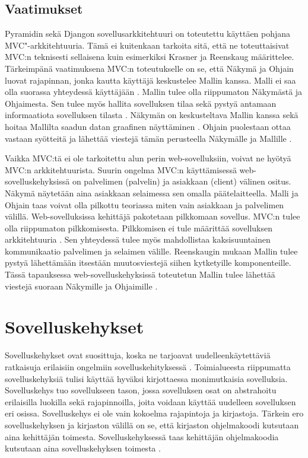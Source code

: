 \documentclass[utf8]{gradu3}
\begin{document}
\section{Vaatimukset}
Pyramidin sekä Djangon sovellusarkkitehtuuri on toteutettu käyttäen pohjana MVC"-arkkitehtuuria. Tämä ei kuitenkaan tarkoita sitä, että ne toteuttaisivat MVC:n teknisesti sellaisena kuin esimerkiksi Krasner \parencite{krasner_desc} ja Reenskaug \parencite{reenskaug_tools} määrittelee. Tärkeimpänä vaatimuksena MVC:n toteutukselle on se, että Näkymä ja Ohjain luovat rajapinnan, jonka kautta käyttäjä keskustelee Mallin kanssa. Malli ei saa olla suorassa yhteydessä käyttäjään \parencite[s. 10]{reenskaug_tools}. Mallin tulee olla riippumaton Näkymästä ja Ohjaimesta. Sen tulee myös hallita sovelluksen tilaa sekä pystyä antamaan informaatiota sovelluksen tilasta \parencite{burbeck}. Näkymän on keskusteltava Mallin kanssa sekä hoitaa Mallilta saadun datan graafinen näyttäminen \parencite[s.1]{reenskaug_orig}. Ohjain puolestaan ottaa vastaan syötteitä ja lähettää viestejä tämän perusteella Näkymälle ja Mallille \parencite{burbeck}.

Vaikka MVC:tä ei ole tarkoitettu alun perin web-sovelluksiin, voivat ne hyötyä MVC:n arkkitehtuurista. Suurin ongelma MVC:n käyttämisessä web-sovelluskehyksissä on palvelimen (palvelin) ja asiakkaan (client) välinen ositus. Näkymä näytetään aina asiakkaan selaimessa sen omalla päätelaitteella. Malli ja Ohjain taas voivat olla pilkottu teoriassa miten vain asiakkaan ja palvelimen välillä. Web-sovelluksissa kehittäjä pakotetaan pilkkomaan sovellus. MVC:n tulee olla riippumaton pilkkomisesta. Pilkkomisen ei tule määrittää sovelluksen arkkitehtuuria \parencite{ibm_watson}. Sen yhteydessä tulee myös mahdollistaa kaksisuuntainen kommunikaatio palvelimen ja selaimen välille. Reenskaugin mukaan Mallin tulee pystyä lähettämään itsestään muutosviestejä siihen kytketyille komponenteille. Tässä tapauksessa web-sovelluskehyksissä toteutetun Mallin tulee lähettää viestejä suoraan Näkymille ja Ohjaimille \parencite{reenskaug_tools}. 

\chapter{Sovelluskehykset}
Sovelluskehykset ovat suosittuja, koska ne tarjoavat uudelleenkäytettäviä ratkaisuja erilaisiin ongelmiin sovelluskehityksessä \parencite{towards_framework}. Toimialueesta riippumatta sovelluskehyksiä tulisi käyttää hyväksi kirjottaessa monimutkaisia sovelluksia. Sovelluskehys tuo sovellukseen tason, jossa sovelluksen osat on abstrahoitu erilaisilla luokilla sekä rajapinnoilla, joita voidaan käyttää uudelleen sovelluksen eri osissa. Sovelluskehys ei ole vain kokoelma rajapintoja ja kirjastoja\parencite{towards_framework}. Tärkein ero sovelluskehyksen ja kirjaston välillä on se, että kirjaston ohjelmakoodi kutsutaan aina
kehittäjän toimesta. Sovelluskehyksessä taas kehittäjän ohjelmakoodia kutsutaan aina sovelluskehyksen toimesta \parencite{pyramid_intr}.
\end{document}
